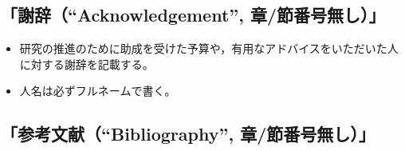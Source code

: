 \documentclass[12pt, ]{jsarticle}
\providecommand{\tightlist}{%
   \setlength{\itemsep}{0pt}\setlength{\parskip}{0pt}}
\begin{document}
\subsection{\texorpdfstring{「謝辞（``Acknowledgement'',
章/節番号無し）」}{「謝辞（Acknowledgement, 章/節番号無し）」}}\label{ux8b1dux8f9eacknowledgement-ux7ae0ux7bc0ux756aux53f7ux7121ux3057}

\begin{itemize}
\tightlist
\item
  研究の推進のために助成を受けた予算や，有用なアドバイスをいただいた人に対する謝辞を記載する。
\item
  人名は必ずフルネームで書く。
\end{itemize}

\subsection{\texorpdfstring{「参考文献（``Bibliography'',
章/節番号無し）」}{「参考文献（Bibliography, 章/節番号無し）」}}\label{ux53c2ux8003ux6587ux732ebibliography-ux7ae0ux7bc0ux756aux53f7ux7121ux3057}
\end{document}

